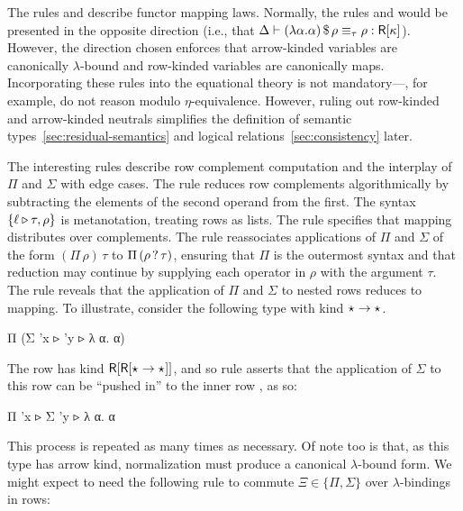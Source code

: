 \documentclass[sigplan,screen]{acmart}
\begin{document}
The rules  and  describe functor mapping laws. Normally, the rules \erule{$\eta$} and  would be presented in the opposite direction (i.e., that $\Delta \vdash {(\lambda \alpha. \alpha)} \, \mathdollar \, \rho \equiv_{\tau} \rho : \mathsf{R}[{\kappa}]$). However, the direction chosen enforces that arrow-kinded variables are canonically $\lambda$-bound and row-kinded variables are canonically maps. Incorporating these rules into the equational theory is not mandatory---\citet{ChapmanKNW19}, for example, do not reason modulo $\eta$-equivalence. However, ruling out row-kinded and arrow-kinded neutrals simplifies the definition of semantic types~\cref{sec:residual-semantics} and logical relations~\cref{sec:consistency} later.

The interesting rules describe row complement computation and the interplay of $\Pi$ and $\Sigma$ with edge cases. The rule \erule{$\Compl$} reduces row complements algorithmically by subtracting the elements of the second operand from the first. The syntax $\{ \ell \triangleright \tau, \rho\}$ is metanotation, treating rows as lists. The rule  specifies that mapping distributes over complements. The rule  reassociates applications of $\Pi$ and $\Sigma$ of the form $(\Pi\, \rho)\, \tau$ to $\Pi\, (\rho \, ? \, \tau)$, ensuring that $\Pi$ is the outermost syntax and that reduction may continue by supplying each operator in $\rho$ with the argument $\tau$. The rule \erule{$\Xi$} reveals that the application of $\Pi$ and $\Sigma$ to nested rows reduces to mapping. To illustrate, consider the following type with kind $\star_{} \to \star_{}$.

\begin{rosi} 
Π (Σ {'x ▹ {'y ▹ λ α. α}})
\end{rosi}

\Ni The row  has kind $\mathsf{R}[{\mathsf{R}[{\star_{} \to \star_{}}]}]$, and so rule \errule{$\Sigma$} asserts that the application of $\Sigma$ to this row can be ``pushed in'' to the inner row , as so: 

\begin{rosi} 
Π {'x ▹ Σ {'y ▹ λ α. α}}
\end{rosi}

\Ni This process is repeated as many times as necessary. Of note too is that, as this type has arrow kind, normalization must produce a canonical $\lambda$-bound form. We might expect to need the following rule to commute $\Xi \in \{\Pi, \Sigma\}$ over $\lambda$-bindings in rows: 
\end{document}
